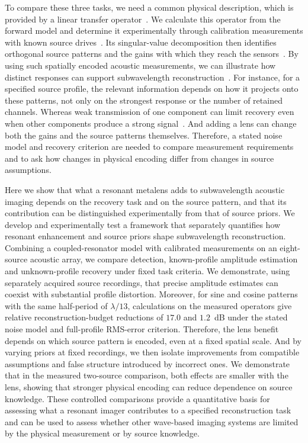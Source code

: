\documentclass[lineno,pdflatex,sn-nature]{sn-jnl}%
\theoremstyle{thmstyleone}%
\theoremstyle{thmstyletwo}%
\theoremstyle{thmstylethree}%
\begin{document}
To compare these three tasks, we need a common physical description, which is provided by a linear transfer operator~\cite{prada1994,miller2000}. We calculate this operator from the forward model and determine it experimentally through calibration measurements with known source drives~\cite{tanter2000,popoff2010}. Its singular-value decomposition then identifies orthogonal source patterns and the gains with which they reach the sensors~\cite{aubry2010,miller2019}. By using such spatially encoded acoustic measurements, we can illustrate how distinct responses can support subwavelength reconstruction~\cite{tian2022}. For instance, for a specified source profile, the relevant information depends on how it projects onto these patterns, not only on the strongest response or the number of retained channels. Whereas weak transmission of one component can limit recovery even when other components produce a strong signal~\cite{hansen2010}. And adding a lens can change both the gains and the source patterns themselves. Therefore, a stated noise model and recovery criterion are needed to compare measurement requirements and to ask how changes in physical encoding differ from changes in source assumptions.

Here we show that what a resonant metalens adds to subwavelength acoustic imaging depends on the recovery task and on the source pattern, and that its contribution can be distinguished experimentally from that of source priors. We develop and experimentally test a framework that separately quantifies how resonant enhancement and source priors shape subwavelength reconstruction. Combining a coupled-resonator model with calibrated measurements on an eight-source acoustic array, we compare detection, known-profile amplitude estimation and unknown-profile recovery under fixed task criteria. We demonstrate, using separately acquired source recordings, that precise amplitude estimates can coexist with substantial profile distortion. Moreover, for sine and cosine patterns with the same half-period of $\lambda/13$, calculations on the measured operators give relative reconstruction-budget reductions of $17.0$ and $1.2$~dB under the stated noise model and full-profile RMS-error criterion. Therefore, the lens benefit depends on which source pattern is encoded, even at a fixed spatial scale. And by varying priors at fixed recordings, we then isolate improvements from compatible assumptions and false structure introduced by incorrect ones. We demonstrate that in the measured two-source comparison, both effects are smaller with the lens, showing that stronger physical encoding can reduce dependence on source knowledge. These controlled comparisons provide a quantitative basis for assessing what a resonant imager contributes to a specified reconstruction task and can be used to assess whether other wave-based imaging systems are limited by the physical measurement or by source knowledge.
\end{document}
